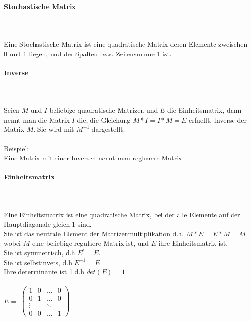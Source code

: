 \documentclass[a4paper]{article} %
\begin{document}
	\paragraph{Stochastische Matrix  } 
	\hspace{0 cm} \\ \noindent \\
	Eine Stochastische Matrix ist eine quadratische Matrix deren Elemente zweischen 0 und 1 liegen, und der Spalten bzw. Zeilensumme 1 ist.
	
	\paragraph{Inverse  } 
	 \hspace{0 cm} \\ \noindent \\
	 Seien  $M$ und $I$ beliebige quadratische Matrizen und $E$ die Einheitsmatrix, dann nennt man die Matrix $I$ die, die Gleichung $M*I=I*M=E$ erfuellt, Inverse der Matrix $M$. Sie wird mit $M^{-1}$ dargestellt.\\\\
	 Beispiel:\\
	 Eine Matrix mit einer Inversen nennt man regluaere Matrix.
	
	\paragraph{Einheitsmatrix} 
	 \hspace{0 cm} \\ \noindent \\ Eine Einheitsmatrix ist eine quadratische Matrix, bei der alle Elemente auf der Hauptdiagonale gleich 1 sind.\\
	Sie ist das neutrale Element der Matrizenmultiplikation d.h. $M*E = E*M = M$ wobei $M$ eine beliebige regulaere Matrix ist, und $E$ ihre Einheitsmatrix ist.\\
	Sie ist symmetrisch, d.h $E^{t}=E$.\\
	Sie ist selbstinvers, d.h $E^{-1}=E$\\
	Ihre determinante ist 1 d.h $det(E)=1$\\\\
	$E =$
		$
		\begin{pmatrix}
		1 & 0 	& ... 	& 0\\
		0 & 1 	& ...	& 0\\
		\vdots  &     	& \ddots  \\
		0 & 0	& ...	& 1
		\end{pmatrix}
		$\\
\end{document}
